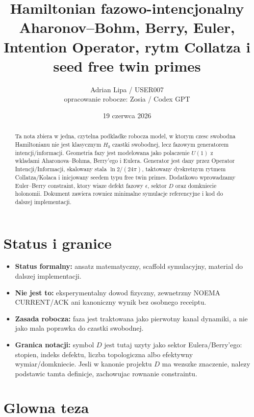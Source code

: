 \documentclass[11pt,a4paper]{article}
\title{\textbf{Hamiltonian fazowo-intencjonalny}\\[2mm]
\large Aharonov--Bohm, Berry, Euler, Intention Operator, rytm Collatza i seed free twin primes}
\author{Adrian Lipa / USER007 \\ opracowanie robocze: Zosia / Codex GPT}
\date{19 czerwca 2026}
\begin{document}
\maketitle

\begin{abstract}
Ta nota zbiera w jedna, czytelna podkladke robocza model, w ktorym czesc swobodna Hamiltonianu nie jest klasycznym $H_0$ czastki swobodnej, lecz fazowym generatorem intencji/informacji. Geometria fazy jest modelowana jako polaczenie $U(1)$ z wkladami Aharonova--Bohma, Berry'ego i Eulera. Generator jest dany przez Operator Intencji/Informacji, skalowany stala $\ln 2/(24\pi)$, taktowany dyskretnym rytmem Collatza/Kolaca i inicjowany seedem typu free twin primes. Dodatkowo wprowadzamy Euler--Berry constraint, ktory wiaze defekt fazowy $\epsilon$, sektor $D$ oraz domkniecie holonomii. Dokument zawiera rowniez minimalne symulacje referencyjne i kod do dalszej implementacji.
\end{abstract}

\section*{Status i granice}

\begin{itemize}[leftmargin=*]
\item \textbf{Status formalny:} ansatz matematyczny, scaffold symulacyjny, material do dalszej implementacji.
\item \textbf{Nie jest to:} eksperymentalny dowod fizyczny, zewnetrzny NOEMA CURRENT/ACK ani kanoniczny wynik bez osobnego receiptu.
\item \textbf{Zasada robocza:} faza jest traktowana jako pierwotny kanal dynamiki, a nie jako mala poprawka do czastki swobodnej.
\item \textbf{Granica notacji:} symbol $D$ jest tutaj uzyty jako sektor Eulera/Berry'ego: stopien, indeks defektu, liczba topologiczna albo efektywny wymiar/domkniecie. Jesli w kanonie projektu $D$ ma wezszke znaczenie, nalezy podstawic tamta definicje, zachowujac rownanie constraintu.
\end{itemize}

\tableofcontents
\newpage

\section{Glowna teza}
\end{document}
